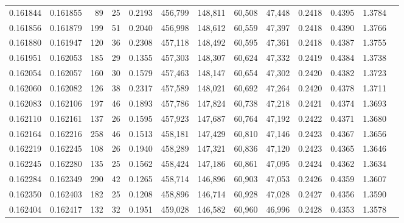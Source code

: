\begin{tabular}{rrrrrrrrrrrrr}
0.161844 & 0.161855 &    89 &  25 &                                     0.2193 & 456,799 & 148,811 &  60,508 &  47,448 & 0.2418 & 0.4395 & 1.3784 \\
0.161856 & 0.161879 &   199 &  51 &                                     0.2040 & 456,998 & 148,612 &  60,559 &  47,397 & 0.2418 & 0.4390 & 1.3766 \\
0.161880 & 0.161947 &   120 &  36 &                                     0.2308 & 457,118 & 148,492 &  60,595 &  47,361 & 0.2418 & 0.4387 & 1.3755 \\
0.161951 & 0.162053 &   185 &  29 &                                     0.1355 & 457,303 & 148,307 &  60,624 &  47,332 & 0.2419 & 0.4384 & 1.3738 \\
0.162054 & 0.162057 &   160 &  30 &                                     0.1579 & 457,463 & 148,147 &  60,654 &  47,302 & 0.2420 & 0.4382 & 1.3723 \\
0.162060 & 0.162082 &   126 &  38 &                                     0.2317 & 457,589 & 148,021 &  60,692 &  47,264 & 0.2420 & 0.4378 & 1.3711 \\
0.162083 & 0.162106 &   197 &  46 &                                     0.1893 & 457,786 & 147,824 &  60,738 &  47,218 & 0.2421 & 0.4374 & 1.3693 \\
0.162110 & 0.162161 &   137 &  26 &                                     0.1595 & 457,923 & 147,687 &  60,764 &  47,192 & 0.2422 & 0.4371 & 1.3680 \\
0.162164 & 0.162216 &   258 &  46 &                                     0.1513 & 458,181 & 147,429 &  60,810 &  47,146 & 0.2423 & 0.4367 & 1.3656 \\
0.162219 & 0.162245 &   108 &  26 &                                     0.1940 & 458,289 & 147,321 &  60,836 &  47,120 & 0.2423 & 0.4365 & 1.3646 \\
0.162245 & 0.162280 &   135 &  25 &                                     0.1562 & 458,424 & 147,186 &  60,861 &  47,095 & 0.2424 & 0.4362 & 1.3634 \\
0.162284 & 0.162349 &   290 &  42 &                                     0.1265 & 458,714 & 146,896 &  60,903 &  47,053 & 0.2426 & 0.4359 & 1.3607 \\
0.162350 & 0.162403 &   182 &  25 &                                     0.1208 & 458,896 & 146,714 &  60,928 &  47,028 & 0.2427 & 0.4356 & 1.3590 \\
0.162404 & 0.162417 &   132 &  32 &                                     0.1951 & 459,028 & 146,582 &  60,960 &  46,996 & 0.2428 & 0.4353 & 1.3578 \\

\end{tabular}
